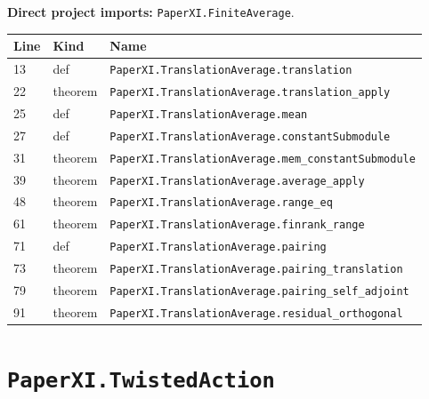 \documentclass[10pt,oneside]{book}
\begin{document}

\textbf{Direct project imports:} \nolinkurl{PaperXI.FiniteAverage}.

\begin{longtable}{@{}p{}p{}p{}@{}}\toprule Line&Kind&Name\\\midrule\endhead

13&def&\nolinkurl{PaperXI.TranslationAverage.translation}\\

22&theorem&\nolinkurl{PaperXI.TranslationAverage.translation_apply}\\

25&def&\nolinkurl{PaperXI.TranslationAverage.mean}\\

27&def&\nolinkurl{PaperXI.TranslationAverage.constantSubmodule}\\

31&theorem&\nolinkurl{PaperXI.TranslationAverage.mem_constantSubmodule}\\

39&theorem&\nolinkurl{PaperXI.TranslationAverage.average_apply}\\

48&theorem&\nolinkurl{PaperXI.TranslationAverage.range_eq}\\

61&theorem&\nolinkurl{PaperXI.TranslationAverage.finrank_range}\\

71&def&\nolinkurl{PaperXI.TranslationAverage.pairing}\\

73&theorem&\nolinkurl{PaperXI.TranslationAverage.pairing_translation}\\

79&theorem&\nolinkurl{PaperXI.TranslationAverage.pairing_self_adjoint}\\

91&theorem&\nolinkurl{PaperXI.TranslationAverage.residual_orthogonal}\\

\bottomrule\end{longtable}

\section{\texorpdfstring{\nolinkurl{PaperXI.TwistedAction}}{PaperXI.TwistedAction}}\label{module:PaperXI.TwistedAction}
\end{document}
